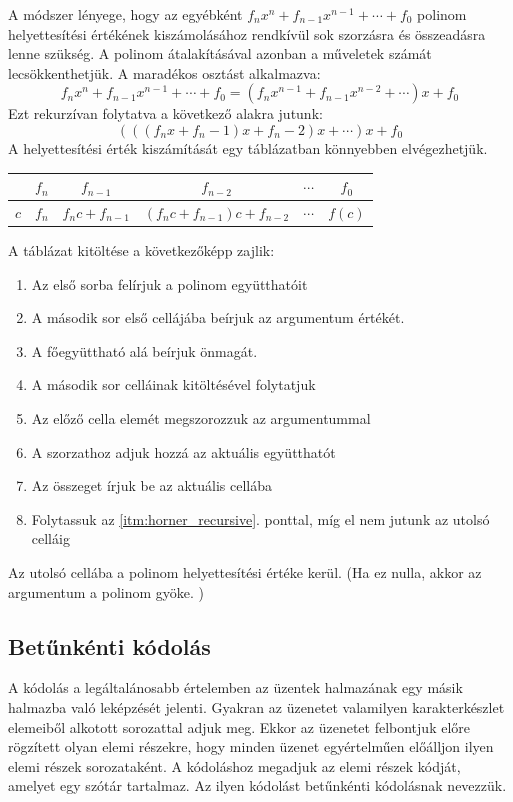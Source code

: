 \documentclass[margin=0px]{article}
\begin{document}
			A módszer lényege, hogy az egyébként $f_nx^n+f_{n-1}x^{n-1}+\cdots+f_0$ polinom helyettesítési értékének kiszámolásához rendkívül sok szorzásra és összeadásra lenne szükség. A polinom átalakításával azonban a műveletek számát lecsökkenthetjük. A maradékos osztást alkalmazva:
			\[f_nx^n+f_{n-1}x^{n-1}+\cdots+f_0 = (f_nx^{n-1}+f_{n-1}x^{n-2}+\cdots)x+f_0\]
			Ezt rekurzívan folytatva a következő alakra jutunk:
			\[(((f_nx+f_n-1)x+f_n-2)x+\cdots)x+f_0\]
			A helyettesítési érték kiszámítását egy táblázatban könnyebben elvégezhetjük.
			
			\begin{center}
				\begin{tabular}{|c|c|c|c|c|c|}
					\hline  & $f_n$ & $f_{n-1}$ & $f_{n-2}$ & $\cdots$ & $f_0$ \\ 
					\hline $c$ & $f_n$ & $f_nc+f_{n-1}$ & $(f_nc+f_{n-1})c+f_{n-2}$ & $\cdots$ & $f(c)$ \\ 
					\hline 
				\end{tabular}
			\end{center}			
			A táblázat kitöltése a következőképp zajlik:
			\begin{enumerate}
				\item Az első sorba felírjuk a polinom együtthatóit
				\item A második sor első cellájába beírjuk az argumentum értékét.
				\item A főegyüttható alá beírjuk önmagát.
				\item A második sor celláinak kitöltésével folytatjuk
				\item \label{itm:horner_recursive} Az előző cella elemét megszorozzuk az argumentummal
				\item A szorzathoz adjuk hozzá az aktuális együtthatót
				\item Az összeget írjuk be az aktuális cellába
				\item Folytassuk az \ref{itm:horner_recursive}. ponttal, míg el nem jutunk az utolsó celláig
			\end{enumerate}
			
			\noindent
			Az utolsó cellába a polinom helyettesítési értéke kerül. (Ha ez nulla, akkor az argumentum a polinom gyöke. )
		\subsection{Betűnkénti kódolás}
			A kódolás a legáltalánosabb értelemben az üzentek halmazának egy másik halmazba való leképzését jelenti. Gyakran az üzenetet valamilyen karakterkészlet elemeiből alkotott sorozattal adjuk meg. Ekkor az üzenetet felbontjuk előre rögzített olyan elemi részekre, hogy minden üzenet egyértelműen előálljon ilyen elemi részek sorozataként. A kódoláshoz megadjuk az elemi részek kódját, amelyet egy szótár tartalmaz. Az ilyen kódolást betűnkénti kódolásnak nevezzük.
			
\end{document}
